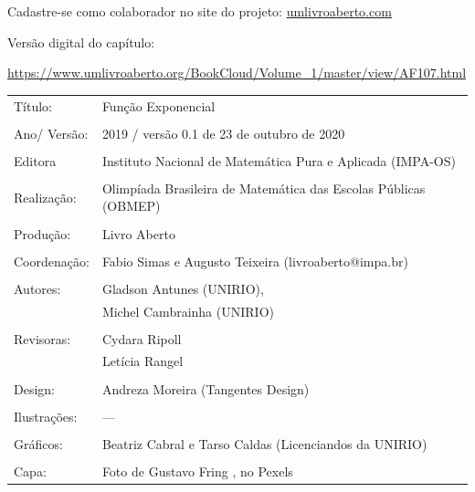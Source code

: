 \vspace*{.3cm}

Cadastre-se como colaborador no site do projeto: \url{umlivroaberto.com}

Versão digital do capítulo:

\url{https://www.umlivroaberto.org/BookCloud/Volume_1/master/view/AF107.html}


\begin{tabular}{p{}p{}}
Título: & Função Exponencial\\
\\
Ano/ Versão: & 2019 / versão 0.1 de 23 de outubro de 2020\\
\\
Editora & Instituto Nacional de Matem\'atica Pura e Aplicada (IMPA-OS)\\
\\
Realização:& Olimp\'iada Brasileira de Matem\'atica das Escolas P\'ublicas (OBMEP)\\
\\
Produção:& Livro Aberto\\
\\
Coordenação:& Fabio Simas e Augusto Teixeira (livroaberto@impa.br)\\
\\
  Autores: & Gladson Antunes (UNIRIO),\\
        & Michel Cambrainha (UNIRIO)\\
\\
Revisoras: &  Cydara Ripoll  \\
                &  Letícia Rangel \\
\\
Design: & Andreza Moreira (Tangentes Design) \\
\\
  Ilustrações: & --- \\ 
\\
Gráficos: & Beatriz Cabral e Tarso Caldas (Licenciandos da UNIRIO)\\
\\
  Capa: & Foto de Gustavo Fring , no Pexels \\

\end{tabular}


